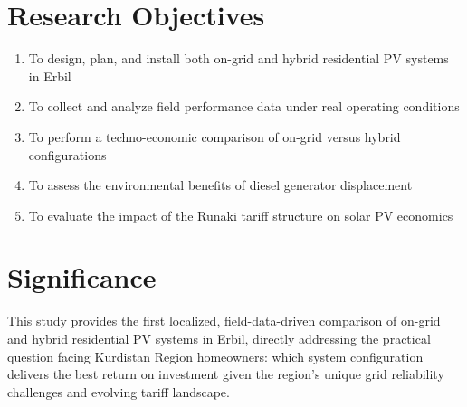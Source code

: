 \section{Research Objectives}

\begin{enumerate}
    \item To design, plan, and install both on-grid and hybrid residential PV systems in Erbil
    \item To collect and analyze field performance data under real operating conditions
    \item To perform a techno-economic comparison of on-grid versus hybrid configurations
    \item To assess the environmental benefits of diesel generator displacement
    \item To evaluate the impact of the Runaki tariff structure on solar PV economics
\end{enumerate}


\section{Significance}

This study provides the first localized, field-data-driven comparison of on-grid and hybrid residential PV systems in Erbil, directly addressing the practical question facing Kurdistan Region homeowners: which system configuration delivers the best return on investment given the region's unique grid reliability challenges and evolving tariff landscape.
